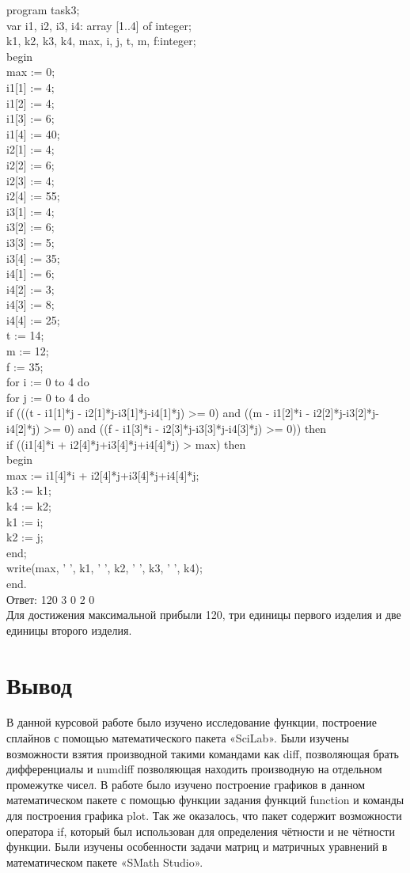 \documentclass[russian,utf8,nocolumnxxxi,nocolumnxxxii]{eskdtext}
\begin{document}
program task3;\\
var i1, i2, i3, i4: array [1..4] of integer;\\
k1, k2, k3, k4, max, i, j, t, m, f:integer;\\
begin\\
max := 0;\\
i1[1] := 4;\\
i1[2] := 4;\\
i1[3] := 6;\\
i1[4] := 40;\\
i2[1] := 4;\\
i2[2] := 6;\\
i2[3] := 4;\\
i2[4] := 55;\\
i3[1] := 4;\\
i3[2] := 6;\\
i3[3] := 5;\\
i3[4] := 35;\\
i4[1] := 6;\\
i4[2] := 3;\\
i4[3] := 8;\\
i4[4] := 25;\\
t := 14;\\
m := 12;\\
f := 35;\\
for i := 0 to 4 do\\
for j := 0 to 4 do\\
if (((t - i1[1]*j - i2[1]*j-i3[1]*j-i4[1]*j) >= 0) and ((m - i1[2]*i - i2[2]*j-i3[2]*j-i4[2]*j) >= 0) and ((f - i1[3]*i - i2[3]*j-i3[3]*j-i4[3]*j) >= 0)) then\\
if ((i1[4]*i + i2[4]*j+i3[4]*j+i4[4]*j) > max) then\\
begin\\
max := i1[4]*i + i2[4]*j+i3[4]*j+i4[4]*j;\\
k3 := k1;\\
k4 := k2;\\
k1 := i;\\
k2 := j;\\
end;\\
write(max, ' ', k1, ' ', k2, ' ', k3, ' ', k4);\\
end.\\
Ответ: 120 3 0 2 0\\
Для достижения максимальной прибыли 120, три единицы первого изделия и две единицы второго изделия.\\
\newpage
\section{Вывод}
В данной курсовой работе было изучено исследование функции, построение сплайнов с помощью математического пакета «SciLab». Были изучены возможности взятия производной такими командами как diff, позволяющая брать дифференциалы и numdiff позволяющая находить производную на отдельном промежутке чисел. В работе было изучено построение графиков в данном математическом пакете с помощью функции задания функций function и команды для построения графика plot.  Так же оказалось, что пакет содержит возможности оператора if, который был использован для определения чётности и не чётности функции. Были изучены особенности задачи матриц и матричных уравнений в математическом пакете  «SMath Studio».
\newpage
\end{document}
